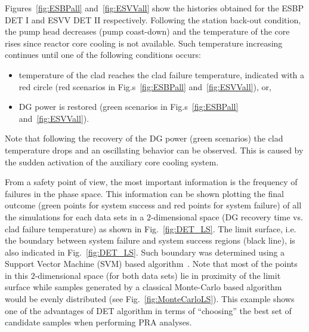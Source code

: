 \documentclass{mc2013}
\begin{document}
Figures~\ref{fig:ESBPall} and~\ref{fig:ESVVall} show the histories obtained for the ESBP DET I and ESVV DET II respectively.
Following the station back-out condition, the pump head decreases (pump coast-down) and the temperature of the core rises since reactor core cooling is not available. Such temperature increasing continues until one of the following conditions occurs:
\vspace{-5mm}
\begin{itemize}
\item temperature of the clad reaches the clad failure temperature, indicated with a red circle (red scenarios in Fig.s~\ref{fig:ESBPall} and~\ref{fig:ESVVall}), or,
\item DG power is restored (green scenarios in Fig.s~\ref{fig:ESBPall} and~\ref{fig:ESVVall}).
\end{itemize}
\vspace{-5mm}
Note that following the recovery of the DG power (green scenarios) the clad temperature drops  and an oscillating behavior can be observed.
This is caused by the sudden activation of the auxiliary core cooling system.

From a safety point of view, the most important information is the frequency of failures in the phase space. This information can be shown plotting the final outcome (green points for system success and red points for system failure) of all the simulations for each data sets in a $2$-dimensional space (DG recovery time vs. clad failure temperature) as shown in Fig.~\ref{fig:DET_LS}.
The limit surface, i.e. the boundary between system failure and system success regions (black line), is also indicated in Fig.~\ref{fig:DET_LS}. Such boundary was determined using a Support Vector Machine (SVM) based algorithm~\cite{mandelliSVMANS}.
Note that most of the points in this $2$-dimensional space (for both data sets) lie in proximity  of the limit surface while samples generated by a classical Monte-Carlo based algorithm would be evenly distributed (see Fig.~\ref{fig:MonteCarloLS}). 
This example shows one of the advantages of DET algorithm in terms of ``choosing'' the best set of candidate samples when performing PRA analyses.

\end{document}
